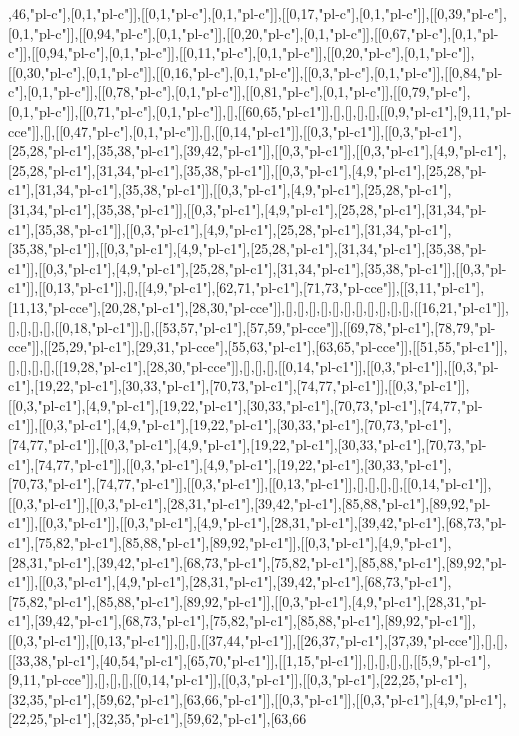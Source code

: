 ,46,"pl-c"],[0,1,"pl-c"]],[[0,1,"pl-c"],[0,1,"pl-c"]],[[0,17,"pl-c"],[0,1,"pl-c"]],[[0,39,"pl-c"],[0,1,"pl-c"]],[[0,94,"pl-c"],[0,1,"pl-c"]],[[0,20,"pl-c"],[0,1,"pl-c"]],[[0,67,"pl-c"],[0,1,"pl-c"]],[[0,94,"pl-c"],[0,1,"pl-c"]],[[0,11,"pl-c"],[0,1,"pl-c"]],[[0,20,"pl-c"],[0,1,"pl-c"]],[[0,30,"pl-c"],[0,1,"pl-c"]],[[0,16,"pl-c"],[0,1,"pl-c"]],[[0,3,"pl-c"],[0,1,"pl-c"]],[[0,84,"pl-c"],[0,1,"pl-c"]],[[0,78,"pl-c"],[0,1,"pl-c"]],[[0,81,"pl-c"],[0,1,"pl-c"]],[[0,79,"pl-c"],[0,1,"pl-c"]],[[0,71,"pl-c"],[0,1,"pl-c"]],[],[[60,65,"pl-c1"]],[],[],[],[],[[0,9,"pl-c1"],[9,11,"pl-cce"]],[],[[0,47,"pl-c"],[0,1,"pl-c"]],[],[[0,14,"pl-c1"]],[[0,3,"pl-c1"]],[[0,3,"pl-c1"],[25,28,"pl-c1"],[35,38,"pl-c1"],[39,42,"pl-c1"]],[[0,3,"pl-c1"]],[[0,3,"pl-c1"],[4,9,"pl-c1"],[25,28,"pl-c1"],[31,34,"pl-c1"],[35,38,"pl-c1"]],[[0,3,"pl-c1"],[4,9,"pl-c1"],[25,28,"pl-c1"],[31,34,"pl-c1"],[35,38,"pl-c1"]],[[0,3,"pl-c1"],[4,9,"pl-c1"],[25,28,"pl-c1"],[31,34,"pl-c1"],[35,38,"pl-c1"]],[[0,3,"pl-c1"],[4,9,"pl-c1"],[25,28,"pl-c1"],[31,34,"pl-c1"],[35,38,"pl-c1"]],[[0,3,"pl-c1"],[4,9,"pl-c1"],[25,28,"pl-c1"],[31,34,"pl-c1"],[35,38,"pl-c1"]],[[0,3,"pl-c1"],[4,9,"pl-c1"],[25,28,"pl-c1"],[31,34,"pl-c1"],[35,38,"pl-c1"]],[[0,3,"pl-c1"],[4,9,"pl-c1"],[25,28,"pl-c1"],[31,34,"pl-c1"],[35,38,"pl-c1"]],[[0,3,"pl-c1"]],[[0,13,"pl-c1"]],[],[[4,9,"pl-c1"],[62,71,"pl-c1"],[71,73,"pl-cce"]],[[3,11,"pl-c1"],[11,13,"pl-cce"],[20,28,"pl-c1"],[28,30,"pl-cce"]],[],[],[],[],[],[],[],[],[],[],[],[[16,21,"pl-c1"]],[],[],[],[],[[0,18,"pl-c1"]],[],[[53,57,"pl-c1"],[57,59,"pl-cce"]],[[69,78,"pl-c1"],[78,79,"pl-cce"]],[[25,29,"pl-c1"],[29,31,"pl-cce"],[55,63,"pl-c1"],[63,65,"pl-cce"]],[[51,55,"pl-c1"]],[],[],[],[],[[19,28,"pl-c1"],[28,30,"pl-cce"]],[],[],[],[[0,14,"pl-c1"]],[[0,3,"pl-c1"]],[[0,3,"pl-c1"],[19,22,"pl-c1"],[30,33,"pl-c1"],[70,73,"pl-c1"],[74,77,"pl-c1"]],[[0,3,"pl-c1"]],[[0,3,"pl-c1"],[4,9,"pl-c1"],[19,22,"pl-c1"],[30,33,"pl-c1"],[70,73,"pl-c1"],[74,77,"pl-c1"]],[[0,3,"pl-c1"],[4,9,"pl-c1"],[19,22,"pl-c1"],[30,33,"pl-c1"],[70,73,"pl-c1"],[74,77,"pl-c1"]],[[0,3,"pl-c1"],[4,9,"pl-c1"],[19,22,"pl-c1"],[30,33,"pl-c1"],[70,73,"pl-c1"],[74,77,"pl-c1"]],[[0,3,"pl-c1"],[4,9,"pl-c1"],[19,22,"pl-c1"],[30,33,"pl-c1"],[70,73,"pl-c1"],[74,77,"pl-c1"]],[[0,3,"pl-c1"]],[[0,13,"pl-c1"]],[],[],[],[],[[0,14,"pl-c1"]],[[0,3,"pl-c1"]],[[0,3,"pl-c1"],[28,31,"pl-c1"],[39,42,"pl-c1"],[85,88,"pl-c1"],[89,92,"pl-c1"]],[[0,3,"pl-c1"]],[[0,3,"pl-c1"],[4,9,"pl-c1"],[28,31,"pl-c1"],[39,42,"pl-c1"],[68,73,"pl-c1"],[75,82,"pl-c1"],[85,88,"pl-c1"],[89,92,"pl-c1"]],[[0,3,"pl-c1"],[4,9,"pl-c1"],[28,31,"pl-c1"],[39,42,"pl-c1"],[68,73,"pl-c1"],[75,82,"pl-c1"],[85,88,"pl-c1"],[89,92,"pl-c1"]],[[0,3,"pl-c1"],[4,9,"pl-c1"],[28,31,"pl-c1"],[39,42,"pl-c1"],[68,73,"pl-c1"],[75,82,"pl-c1"],[85,88,"pl-c1"],[89,92,"pl-c1"]],[[0,3,"pl-c1"],[4,9,"pl-c1"],[28,31,"pl-c1"],[39,42,"pl-c1"],[68,73,"pl-c1"],[75,82,"pl-c1"],[85,88,"pl-c1"],[89,92,"pl-c1"]],[[0,3,"pl-c1"]],[[0,13,"pl-c1"]],[],[],[[37,44,"pl-c1"]],[[26,37,"pl-c1"],[37,39,"pl-cce"]],[],[],[[33,38,"pl-c1"],[40,54,"pl-c1"],[65,70,"pl-c1"]],[[1,15,"pl-c1"]],[],[],[],[],[[5,9,"pl-c1"],[9,11,"pl-cce"]],[],[],[],[[0,14,"pl-c1"]],[[0,3,"pl-c1"]],[[0,3,"pl-c1"],[22,25,"pl-c1"],[32,35,"pl-c1"],[59,62,"pl-c1"],[63,66,"pl-c1"]],[[0,3,"pl-c1"]],[[0,3,"pl-c1"],[4,9,"pl-c1"],[22,25,"pl-c1"],[32,35,"pl-c1"],[59,62,"pl-c1"],[63,66